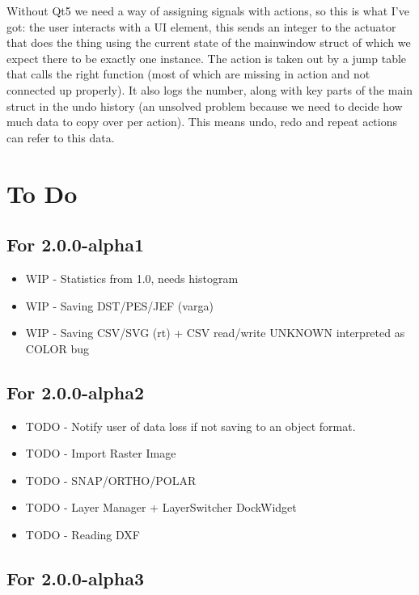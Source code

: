 \documentclass{report}
\begin{document}
Without Qt5 we need a way of assigning signals with actions, so this is what I've got: the user interacts with a UI element, this sends an integer to the actuator that does the thing using the current state of the mainwindow struct of which we expect there to be exactly one instance. The action is taken out by a jump table that calls the right function (most of which are missing in action and not connected up properly). It also logs the number, along with key parts of the main struct in the undo history (an unsolved problem because we need to decide how much data to copy over per action). This means undo, redo and repeat actions can refer to this data.

\section{To Do}

\subsection{For 2.0.0-alpha1}

\begin{itemize}
\item WIP - Statistics from 1.0, needs histogram
\item WIP - Saving DST/PES/JEF (varga)
\item WIP - Saving CSV/SVG (rt) + CSV read/write UNKNOWN interpreted as COLOR bug
\end{itemize}

\subsection{For 2.0.0-alpha2}

\begin{itemize}
\item TODO - Notify user of data loss if not saving to an object format.
\item TODO - Import Raster Image
\item TODO - SNAP/ORTHO/POLAR
\item TODO - Layer Manager + LayerSwitcher DockWidget
\item TODO - Reading DXF
\end{itemize}

\subsection{For 2.0.0-alpha3}
\end{document}
